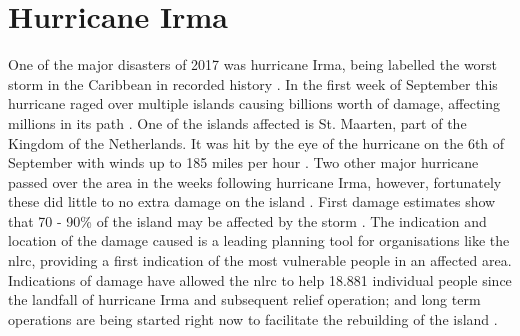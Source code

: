 \section{Hurricane Irma}
One of the major disasters of 2017 was hurricane Irma, being labelled the worst storm in the Caribbean in recorded history \citep{Daniell2017}. In the first week of September this hurricane raged over multiple islands causing billions worth of damage, affecting millions in its path \citep{Phipps2017,Daniell2017}. One of the islands affected is St. Maarten, part of the Kingdom of the Netherlands. It was hit by the eye of the hurricane on the 6th of September with winds up to 185 miles per hour \citep{Wilts2017}. Two other major hurricane passed over the area in the weeks following hurricane Irma, however, fortunately these did little to no extra damage on the island \citep{Gray2017,Bijnsdorp2017}. First damage estimates show that 70 - 90\% of the island may be affected by the storm \citep{Rodekruis2017,UNOSAT2017}. The indication and location of the damage caused is a leading planning tool for organisations like the \ac{nlrc}, providing a first indication of the most vulnerable people in an affected area. Indications of damage have allowed the \ac{nlrc} to help 18.881 individual people since the landfall of hurricane Irma and subsequent relief operation; and long term operations are being started right now to facilitate the rebuilding of the island \citep{Rodekruis2017}. 
\\

